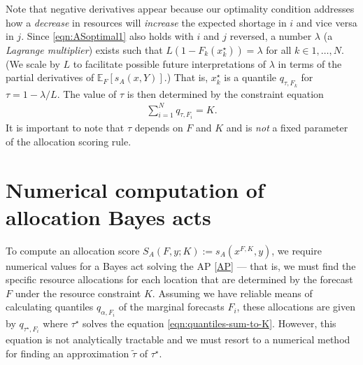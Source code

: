\documentclass{article}
\begin{document}
Note that negative derivatives appear because our optimality condition addresses how a \emph{decrease} in resources will 
\emph{increase} the expected shortage in $i$ and vice versa in $j$. Since \eqref{eqn:ASoptimal1} also holds with $i$ and $j$ 
reversed, a number $\lambda$ (a \emph{Lagrange multiplier}) exists such that
$L(1-F_k(x^{\star}_k)) = \lambda$ for all $k \in 1,\ldots,N$.
(We scale by $L$ to facilitate possible future interpretations of $\lambda$ in terms of the partial derivatives 
of $\mathbb{E}_{F} [s_A(x, Y)]$.)
That is, $x^{\star}_k$ is a quantile $q_{\tau,F_k}$ for
$\tau = 1 - \lambda/L$. The value of $\tau$ is then determined by the constraint equation 
\begin{align}
\sum_{i=1}^N q_{\tau,F_i} = K. \label{eqn:quantiles-sum-to-K}
\end{align}
It is important to note that $\tau$ depends on $F$ and $K$ and is \emph{not} a fixed parameter
of the allocation scoring rule.

\section{Numerical computation of allocation Bayes acts}
\label{sec:numeric}

To compute an allocation score $S_A(F,y;K) := s_A(x^{F,K},y)$, we require numerical values for a 
Bayes act solving the AP \eqref{AP} --- that is, we must find the specific resource allocations for each location that are determined by the forecast $F$ under the resource constraint $K$.
Assuming we have reliable means of calculating quantiles $q_{\alpha,F_i}$ 
of the marginal forecasts $F_i$,  
these allocations are given by $q_{\tau^{\star},F_i}$ where $\tau^{\star}$ solves the equation \eqref{eqn:quantiles-sum-to-K}.
However, this equation is not analytically tractable and we must resort to a numerical method
for finding an approximation $\tilde{\tau}$ of $\tau^{\star}$.
\end{document}
